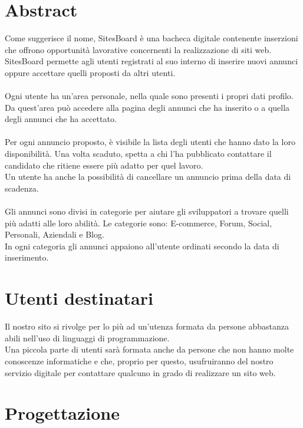 \documentclass[12pt]{article}
\begin{document}
\section{Abstract}
Come suggerisce il nome, SitesBoard è una bacheca digitale contenente inserzioni che offrono opportunità lavorative concernenti la realizzazione di siti web.\\
SitesBoard permette agli utenti registrati al suo interno di inserire nuovi annunci oppure accettare quelli proposti da altri utenti.\\\\
Ogni utente ha un’area personale, nella quale sono presenti i propri dati profilo.\\
Da quest’area può accedere alla pagina degli annunci che ha inserito o a quella degli annunci che ha accettato.\\\\
Per ogni annuncio proposto, è visibile la lista degli utenti che hanno dato la loro disponibilità. Una volta scaduto, spetta a chi l’ha pubblicato contattare il candidato che ritiene essere più adatto per quel lavoro.\\
Un utente ha anche la possibilità di cancellare un annuncio prima della data di scadenza.\\\\
Gli annunci sono divisi in categorie per aiutare gli sviluppatori a trovare quelli più adatti alle loro abilità. Le categorie sono: E-commerce, Forum, Social, Personali, Aziendali e Blog.\\
In ogni categoria gli annunci appaiono all’utente ordinati secondo la data di inserimento.\\


\section{Utenti destinatari}
Il nostro sito si rivolge per lo più ad un’utenza formata da persone abbastanza abili nell’uso di linguaggi di programmazione. \\
Una piccola parte di utenti sarà formata anche da persone che non hanno molte conoscenze informatiche e che, proprio per questo, usufruiranno del nostro servizio digitale per contattare qualcuno in grado di realizzare un sito web.
\newpage

\section{Progettazione}
\end{document}
